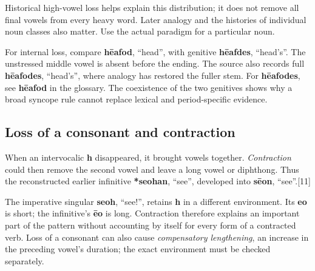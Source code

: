 \endgroup
Historical high-vowel loss helps explain this distribution; it does not remove all final vowels from every heavy word. Later analogy and the histories of individual noun classes also matter. Use the actual paradigm for a particular noun.\par
For internal loss, compare \textbf{hēafod}, “head”, with genitive \textbf{hēafdes}, “head’s”. The unstressed middle vowel is absent before the ending. The source also records full \textbf{hēafodes}, “head’s”, where analogy has restored the fuller stem. For \textbf{hēafodes}, see \textbf{hēafod} in the glossary. The coexistence of the two genitives shows why a broad syncope rule cannot replace lexical and period-specific evidence.\par
\subsection*{Loss of a consonant and contraction}
When an intervocalic \textbf{h} disappeared, it brought vowels together. \emph{Contraction} could then remove the second vowel and leave a long vowel or diphthong. Thus the reconstructed earlier infinitive \textbf{*seohan}, “see”, developed into \textbf{sēon}, “see”.[11]\par
The imperative singular \textbf{seoh}, “see!”, retains \textbf{h} in a different environment. Its \textbf{eo} is short; the infinitive’s \textbf{ēo} is long. Contraction therefore explains an important part of the pattern without accounting by itself for every form of a contracted verb. Loss of a consonant can also cause \emph{compensatory lengthening}, an increase in the preceding vowel’s duration; the exact environment must be checked separately.\par
